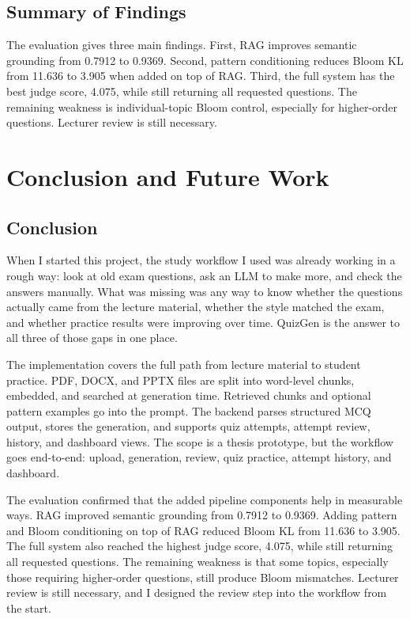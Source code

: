 \documentclass[12pt,a4paper]{article}
\begin{document}
\subsection{Summary of Findings}

The evaluation gives three main findings. First, RAG improves semantic
grounding from 0.7912 to 0.9369. Second, pattern conditioning reduces Bloom
KL from 11.636 to 3.905 when added on top of RAG. Third, the full system has
the best judge score, 4.075, while still returning all requested questions.
The remaining weakness is individual-topic Bloom control, especially for
higher-order questions. Lecturer review is still necessary.

\clearpage
\section{Conclusion and Future Work}

\subsection{Conclusion}

When I started this project, the study workflow I used was already working
in a rough way: look at old exam questions, ask an LLM to make more, and
check the answers manually. What was missing was any way to know whether the
questions actually came from the lecture material, whether the style matched
the exam, and whether practice results were improving over time. QuizGen is
the answer to all three of those gaps in one place.

The implementation covers the full path from lecture material to student
practice. PDF, DOCX, and PPTX files are split into word-level chunks,
embedded, and searched at generation time. Retrieved chunks and optional
pattern examples go into the prompt. The backend parses structured MCQ
output, stores the generation, and supports quiz attempts, attempt review,
history, and dashboard views. The scope is a thesis prototype, but the workflow goes end-to-end:
upload, generation, review, quiz practice, attempt history, and dashboard.

The evaluation confirmed that the added pipeline components help in
measurable ways. RAG improved semantic grounding from 0.7912 to 0.9369.
Adding pattern and Bloom conditioning on top of RAG reduced Bloom KL from
11.636 to 3.905. The full system also reached the highest judge score,
4.075, while still returning all requested questions. The remaining
weakness is that some topics, especially those requiring higher-order
questions, still produce Bloom mismatches. Lecturer review is still
necessary, and I designed the review step into the workflow from the start.
\end{document}
